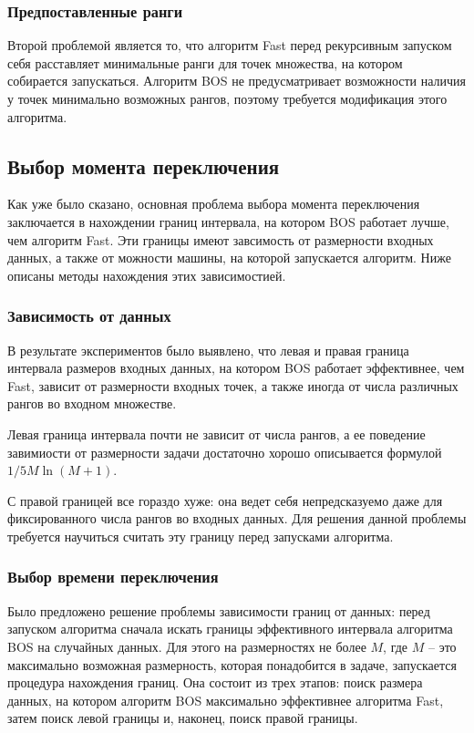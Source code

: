 \subsubsection{Предпоставленные ранги}

Второй проблемой является то, что алгоритм Fast перед рекурсивным запуском себя расставляет минимальные ранги для точек множества, на котором собирается запускаться. Алгоритм BOS не предусматривает возможности наличия у точек минимально возможных рангов, поэтому требуется модификация этого алгоритма.

\subsection{Выбор момента переключения}

Как уже было сказано, основная проблема выбора момента переключения заключается в нахождении границ интервала, на котором BOS работает лучше, чем алгоритм Fast. Эти границы имеют завсимость от размерности входных данных, а также от можности машины, на которой запускается алгоритм. Ниже описаны методы нахождения этих зависимостией.

\subsubsection{Зависимость от данных}

В результате экспериментов было выявлено, что левая и правая граница интервала размеров входных данных, на котором BOS  работает эффективнее, чем Fast, зависит от размерности входных точек, а также иногда от числа различных рангов во входном множестве.

Левая граница интервала почти не зависит от числа рангов, а ее поведение завимиости от размерности задачи достаточно хорошо описывается формулой $1/5 M \ln (M + 1)$.

С правой границей все гораздо хуже: она ведет себя непредсказуемо даже для фиксированного числа рангов во входных данных. Для решения данной проблемы требуется научиться считать эту границу перед запусками алгоритма.

\subsubsection{Выбор времени переключения}

Было предложено решение проблемы зависимости границ от данных: перед запуском алгоритма сначала искать границы эффективного интервала алгоритма BOS на случайных данных. Для этого на размерностях не более $M$, где $M$ -- это максимально возможная размерность, которая понадобится в задаче, запускается процедура нахождения границ. Она состоит из трех этапов: поиск размера данных, на котором алгоритм BOS максимально эффективнее алгоритма Fast, затем поиск левой границы и, наконец, поиск правой границы.

